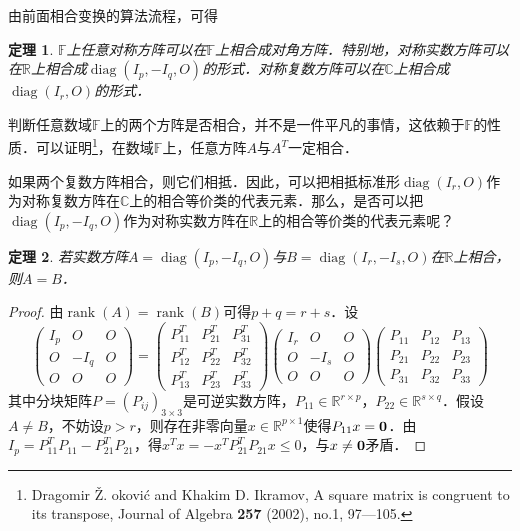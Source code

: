 \documentclass[a4paper,fontset=windows]{ctexbook}
\newtheorem{theorem}{定理}[chapter]
\theoremstyle{definition}
\DeclareMathOperator{\diag}{diag}
\DeclareMathOperator{\rank}{rank}
\renewcommand{\le}{\leqslant}
\begin{document}
由前面相合变换的算法流程，可得

\begin{theorem}\label{thm7.1}
$\mathbb{F}$上任意对称方阵可以在$\mathbb{F}$上相合成对角方阵．特别地，对称实数方阵可以在$\mathbb{R}$上相合成$\diag(I_p,-I_q,O)$的形式．对称复数方阵可以在$\mathbb{C}$上相合成$\diag(I_r,O)$的形式．
\end{theorem}

判断任意数域$\mathbb{F}$上的两个方阵是否相合，并不是一件平凡的事情，这依赖于$\mathbb{F}$的性质．可以证明\footnote{Dragomir \v{Z}. {\DJ}okovi\'c and Khakim D. Ikramov, A square matrix is congruent to its transpose, Journal of Algebra {\bf 257} (2002), no.1, 97—105.}，在数域$\mathbb{F}$上，任意方阵$A$与$A^T$一定相合．

如果两个复数方阵相合，则它们相抵．因此，可以把相抵标准形$\diag(I_r,O)$作为对称复数方阵在$\mathbb{C}$上的相合等价类的代表元素．那么，是否可以把$\diag(I_p,-I_q,O)$作为对称实数方阵在$\mathbb{R}$上的相合等价类的代表元素呢？

\begin{theorem}\label{thm7.2}
若实数方阵$A=\diag(I_p,-I_q,O)$与$B=\diag(I_r,-I_s,O)$在$\mathbb{R}$上相合，则$A=B$．
\end{theorem}

\begin{proof}
由$\rank(A)=\rank(B)$可得$p+q=r+s$．设
$$\begin{pmatrix}I_p&O&O \\ O&-I_q&O \\ O&O&O\end{pmatrix}=\begin{pmatrix}P_{11}^T&P_{21}^T&P_{31}^T \\ P_{12}^T&P_{22}^T&P_{32}^T \\ P_{13}^T&P_{23}^T&P_{33}^T\end{pmatrix}\begin{pmatrix}I_r&O&O \\ O&-I_s&O \\ O&O&O\end{pmatrix}\begin{pmatrix}P_{11}&P_{12}&P_{13} \\ P_{21}&P_{22}&P_{23} \\ P_{31}&P_{32}&P_{33}\end{pmatrix}$$
其中分块矩阵$P=(P_{ij})_{3\times 3}$是可逆实数方阵，$P_{11}\in\mathbb{R}^{r\times p}$，$P_{22}\in\mathbb{R}^{s\times q}$．假设$A\ne B$，不妨设$p>r$，则存在非零向量$x\in\mathbb{R}^{p\times 1}$使得$P_{11}x={\bf 0}$．由$I_p=P_{11}^TP_{11}-P_{21}^TP_{21}$，得$x^Tx=-x^TP_{21}^TP_{21}x\le 0$，与$x\ne{\bf 0}$矛盾．
\end{proof}
\end{document}
